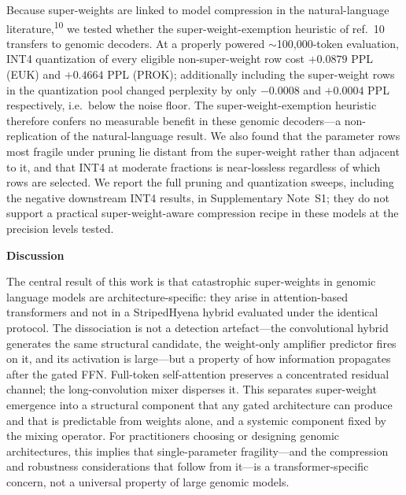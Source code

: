\documentclass[11pt]{article}
\begin{document}
Because super-weights are linked to model compression in the
natural-language literature,\textsuperscript{10} we tested whether the
super-weight-exemption heuristic of ref.~10 transfers to genomic
decoders. At a properly powered $\sim$100{,}000-token evaluation, INT4
quantization of every eligible non-super-weight row cost $+0.0879$ PPL
(EUK) and $+0.4664$ PPL (PROK); additionally including the super-weight
rows in the quantization pool changed perplexity by only $-0.0008$ and
$+0.0004$ PPL respectively, i.e.\ below the noise floor. The
super-weight-exemption heuristic therefore confers no measurable benefit
in these genomic decoders---a non-replication of the natural-language
result. We also found that the parameter rows most fragile under pruning
lie distant from the super-weight rather than adjacent to it, and that
INT4 at moderate fractions is near-lossless regardless of which rows are
selected. We report the full pruning and quantization sweeps, including
the negative downstream INT4 results, in Supplementary Note~S1; they do
not support a practical super-weight-aware compression recipe in these
models at the precision levels tested.

\textbf{Discussion}

The central result of this work is that catastrophic super-weights in
genomic language models are architecture-specific: they arise in
attention-based transformers and not in a StripedHyena hybrid evaluated
under the identical protocol. The dissociation is not a detection
artefact---the convolutional hybrid generates the same structural
candidate, the weight-only amplifier predictor fires on it, and its
activation is large---but a property of how information propagates after
the gated FFN. Full-token self-attention preserves a concentrated
residual channel; the long-convolution mixer disperses it. This
separates super-weight emergence into a structural component that any
gated architecture can produce and that is predictable from weights
alone, and a systemic component fixed by the mixing operator. For
practitioners choosing or designing genomic architectures, this implies
that single-parameter fragility---and the compression and robustness
considerations that follow from it---is a transformer-specific concern,
not a universal property of large genomic models.
\end{document}
